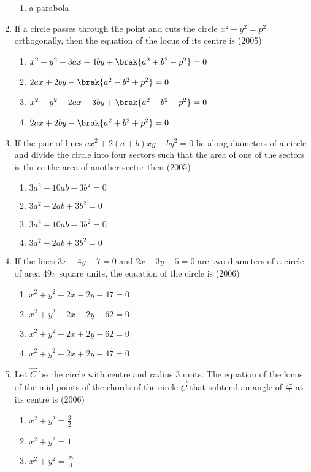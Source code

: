 \begin{enumerate}
\begin{multicols}{2}
\begin{enumerate}
\item a parabola
\end{enumerate}
\end{multicols}
\item If a circle passes through the point  and cuts the circle $x^2+y^2=p^2$ orthogonally,  then the equation of the locus of its centre is 
\hfill{(2005)}
\begin{enumerate}
\item $x^2+y^2-3ax-4by+\brak{a^2+b^2-p^2}=0$
\item $2ax+2by-\brak{a^2-b^2+p^2}=0$
\item $x^2+y^2-2ax-3by+\brak{a^2-b^2-p^2}=0$
\item $2ax+2by-\brak{a^2+b^2+p^2}=0$
\end{enumerate}
\item If the pair of lines $ax^2+2(a+b)xy+by^2=0$ lie along diameters of a circle and divide the circle into four sectors such that the area of one of the sectors is thrice the area of another sector then
\hfill{(2005)}
\begin{enumerate}
\item $3a^2-10ab+3b^2=0$
\item $3a^2-2ab+3b^2=0$
\item $3a^2+10ab+3b^2=0$
\item $3a^2+2ab+3b^2=0$
\end{enumerate}
\item If the lines $3x-4y-7=0$ and $2x-3y-5=0$ are two diameters of a circle of area $49\pi$ square units,  the equation of the circle is 
\hfill{(2006)}
\begin{enumerate}
\item $x^2+y^2+2x-2y-47=0$
\item $x^2+y^2+2x-2y-62=0$
\item $x^2+y^2-2x+2y-62=0$
\item $x^2+y^2-2x+2y-47=0$
\end{enumerate}
\item Let $\vec{C}$ be the circle with centre  and radius 3 units. The equation of the locus of the mid points of the chords of the circle $\vec{C}$ that subtend an angle of $\frac{2\pi}{3}$ at its centre is
\hfill{(2006)}
\begin{multicols}{2}
\begin{enumerate}
\item $x^2+y^2=\frac{3}{2}$
\item $x^2+y^2=1$
\item $x^2+y^2=\frac{27}{4}$

\end{enumerate}
\end{multicols}
\end{enumerate}
